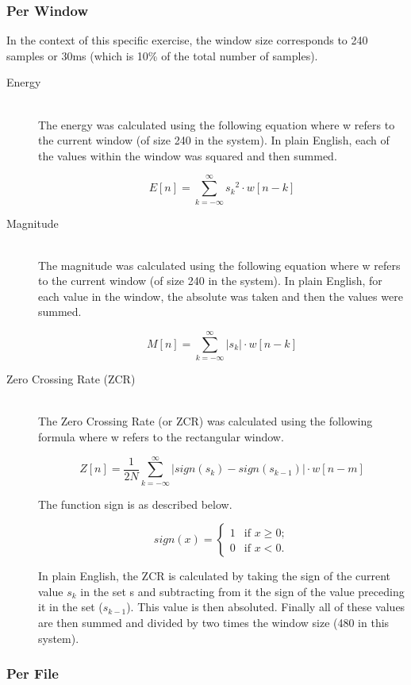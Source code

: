 \documentclass[12pt]{article} %
\begin{document}
\subsubsection{Per Window}
In the context of this specific exercise, the window size corresponds to 240 samples or 30ms (which
is 10\% of the total number of samples). 
\begin{description}
\item[Energy]\hfill \\
The energy was calculated using the following equation where w refers to the current window (of
size 240 in the system). In plain English, each of the values within the window was squared and
then summed.

\[
E[n]= \sum_{k=-\infty}^{\infty} s_k{}^2 \cdot w[n-k]
\]

\item[Magnitude]\hfill \\
The magnitude was calculated using the following equation where w refers to the current window (of
size 240 in the system). In plain English, for each value in the window, the absolute was taken and
then the values were summed.

\[
M[n]= \sum_{k=-\infty}^{\infty} |s_k| \cdot w[n-k]
\]

\item[Zero Crossing Rate (ZCR)]\hfill \\
The Zero Crossing Rate (or ZCR) was calculated using the following formula where w refers to the
rectangular window.

\[
Z[n]= \frac{1}{2N} \sum_{k=-\infty}^{\infty} |sign(s_k) - sign(s_{k-1})| \cdot w[n - m] 
\]

The function sign is as described below.

\[ sign(x) = \left\{ \begin{array}{ll}
         1 & \mbox{if $x \geq 0$};\\
         0 & \mbox{if $x < 0$}.\end{array} \right. \]

In plain English, the ZCR is calculated by taking the sign of the current value $s_k$ in the set s
and subtracting from it the sign of the value preceding it in the set ($s_{k-1}$). This value is
then absoluted. Finally all of these values are then summed and divided by two times the window
size (480 in this system).

\end{description}

\subsubsection{Per File}
\end{document}
